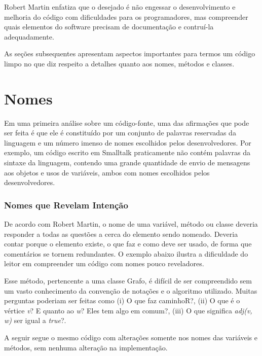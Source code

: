 Robert Martin enfatiza que o desejado é não engessar o desenvolvimento e melhoria do código com dificuldades para os programadores, mas 
compreender quais elementos do software precisam de documentação e contruí-la adequadamente.

\vskip 1.0cm
As seções subsequentes apresentam aspectos importantes para termos um código limpo no que diz respeito a detalhes quanto aos nomes, métodos e classes.

\section{Nomes}
\label{sec:nomes}

Em uma primeira análise sobre um código-fonte, uma das afirmações que pode ser feita é que ele é constituído por um conjunto de palavras reservadas da linguagem e um número imenso de nomes escolhidos pelos desenvolvedores. Por exemplo, um código escrito em Smalltalk praticamente não contém palavras da sintaxe da linguagem, contendo uma grande quantidade de envio de mensagens aos objetos e usos de variáveis, ambos com nomes escolhidos pelos desenvolvedores.

\subsubsection{Nomes que Revelam Intenção}
De acordo com Robert Martin, o nome de uma variável, método ou classe deveria responder a todas as questões a cerca do elemento sendo nomeado. Deveria contar porque o elemento existe, o que faz e como deve ser usado, de forma que comentários se tornem redundantes. O exemplo abaixo ilustra a dificuldade do leitor em compreender um código com nomes pouco reveladores.



Esse método, pertencente a uma classe Grafo, é difícil de ser compreendido sem um vasto conhecimento da convenção de notações e o algoritmo utilizado. Muitas perguntas poderiam ser feitas como (i) O que faz caminhoR?,  (ii) O que é o vértice \textit{v}?  E quanto ao \textit{w}? Eles tem algo em comum?, (iii)  O que significa \textit{adj(v, w)} ser igual a \textit{true}?.

A seguir segue o mesmo código com alterações somente nos nomes das variáveis e métodos, sem nenhuma alteração na implementação.



